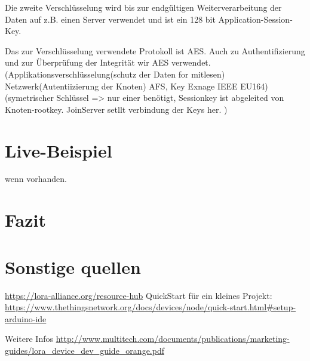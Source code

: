 \documentclass[a4paper,12pt]{article}
\begin{document}
        Die zweite Verschlüsselung wird bis zur endgültigen Weiterverarbeitung der Daten auf z.B. einen Server verwendet und ist ein 128 bit Application-Session-Key.

        Das zur Verschlüsselung verwendete Protokoll ist AES. Auch zu Authentifizierung und zur Überprüfung der Integrität wir AES verwendet.
        \cite{LoRaSecur}
            \cite{WhatIsLoRa}(Applikationsverschlüsselung(schutz der Daten for mitlesen) Netzwerk(Autentiizierung der Knoten) AFS, Key Exnage IEEE EU164)
            \cite{LoRaSpec}(symetrischer Schlüssel => nur einer benötigt, Sessionkey ist abgeleited von Knoten-rootkey. JoinServer setllt verbindung der Keys her.
            )
    \section{Live-Beispiel}
        wenn vorhanden.

    \section{Fazit}
    \section{Sonstige quellen}
        \url{https://lora-alliance.org/resource-hub}
        QuickStart für ein kleines Projekt: \url{https://www.thethingsnetwork.org/docs/devices/node/quick-start.html#setup-arduino-ide}

        Weitere Infos \url{http://www.multitech.com/documents/publications/marketing-guides/lora_device_dev_guide_orange.pdf}
        \newpage
    
    
\end{document}
